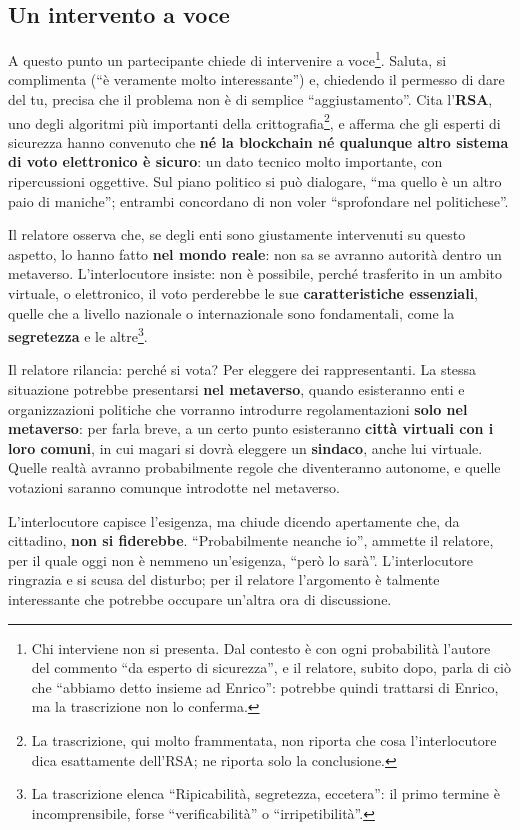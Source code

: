 \subsection{Un intervento a voce}

A questo punto un partecipante chiede di intervenire a voce\footnote{Chi
interviene non si presenta. Dal contesto è con ogni probabilità l'autore del
commento ``da esperto di sicurezza'', e il relatore, subito dopo, parla di ciò
che ``abbiamo detto insieme ad Enrico'': potrebbe quindi trattarsi di Enrico, ma
la trascrizione non lo conferma.}. Saluta, si complimenta (``è veramente molto
interessante'') e, chiedendo il permesso di dare del tu, precisa che il
problema non è di semplice ``aggiustamento''. Cita l'\textbf{RSA}, uno degli
algoritmi più importanti della crittografia\footnote{La trascrizione, qui molto
frammentata, non riporta che cosa l'interlocutore dica esattamente dell'RSA; ne
riporta solo la conclusione.}, e afferma che gli esperti di sicurezza hanno
convenuto che \textbf{né la blockchain né qualunque altro sistema di voto
elettronico è sicuro}: un dato tecnico molto importante, con ripercussioni
oggettive. Sul piano politico si può dialogare, ``ma quello è un altro paio di
maniche''; entrambi concordano di non voler ``sprofondare nel politichese''.

Il relatore osserva che, se degli enti sono giustamente intervenuti su questo
aspetto, lo hanno fatto \textbf{nel mondo reale}: non sa se avranno autorità
dentro un metaverso. L'interlocutore insiste: non è possibile, perché trasferito
in un ambito virtuale, o elettronico, il voto perderebbe le sue
\textbf{caratteristiche essenziali}, quelle che a livello nazionale o
internazionale sono fondamentali, come la \textbf{segretezza} e le
altre\footnote{La trascrizione elenca ``Ripicabilità, segretezza, eccetera'':
il primo termine è incomprensibile, forse ``verificabilità'' o
``irripetibilità''.}.

Il relatore rilancia: perché si vota? Per eleggere dei rappresentanti. La stessa
situazione potrebbe presentarsi \textbf{nel metaverso}, quando esisteranno enti e
organizzazioni politiche che vorranno introdurre regolamentazioni \textbf{solo
nel metaverso}: per farla breve, a un certo punto esisteranno \textbf{città
virtuali con i loro comuni}, in cui magari si dovrà eleggere un
\textbf{sindaco}, anche lui virtuale. Quelle realtà avranno probabilmente regole
che diventeranno autonome, e quelle votazioni saranno comunque introdotte nel
metaverso.

L'interlocutore capisce l'esigenza, ma chiude dicendo apertamente che, da
cittadino, \textbf{non si fiderebbe}. ``Probabilmente neanche io'', ammette il
relatore, per il quale oggi non è nemmeno un'esigenza, ``però lo sarà''.
L'interlocutore ringrazia e si scusa del disturbo; per il relatore l'argomento è
talmente interessante che potrebbe occupare un'altra ora di discussione.

